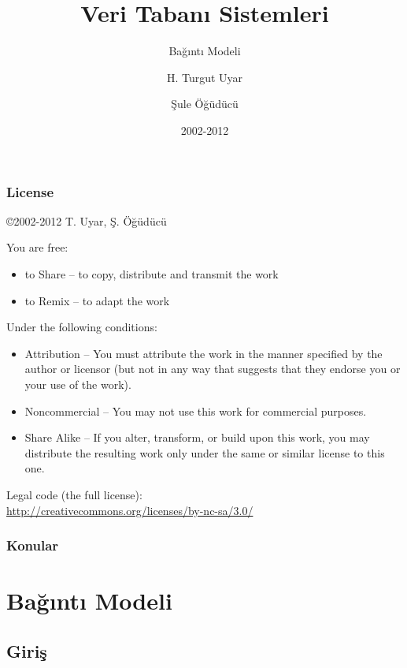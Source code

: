 \documentclass[dvipsnames]{beamer}
\title{Veri Tabanı Sistemleri}
\subtitle{Bağıntı Modeli}
\author{H. Turgut Uyar \and Şule Öğüdücü}
\date{2002-2012}
\theoremstyle{definition}
\theoremstyle{example}
\theoremstyle{plain}
\begin{document}
\begin{frame}
  \titlepage
\end{frame}

\begin{frame}
  \frametitle{License}

  \hfill
  \copyright 2002-2012 T. Uyar, Ş. Öğüdücü

  \vfill
  \begin{tiny}
    You are free:
    \begin{itemize}
      \item to Share -- to copy, distribute and transmit the work
      \item to Remix -- to adapt the work
    \end{itemize}

    Under the following conditions:
    \begin{itemize}
      \item Attribution -- You must attribute the work in the manner specified by
        the author or licensor (but not in any way that suggests that they
        endorse you or your use of the work).

      \item Noncommercial -- You may not use this work for commercial purposes.

      \item Share Alike -- If you alter, transform, or build upon this work, you
        may distribute the resulting work only under the same or similar license
        to this one.
    \end{itemize}
  \end{tiny}

  \vfill
  Legal code (the full license):\\
  \url{http://creativecommons.org/licenses/by-nc-sa/3.0/}
\end{frame}

\begin{frame}
  \frametitle{Konular}
  \tableofcontents
\end{frame}

\lstset{language=TutorialD}

\section{Bağıntı Modeli}

\subsection{Giriş}
\end{document}
